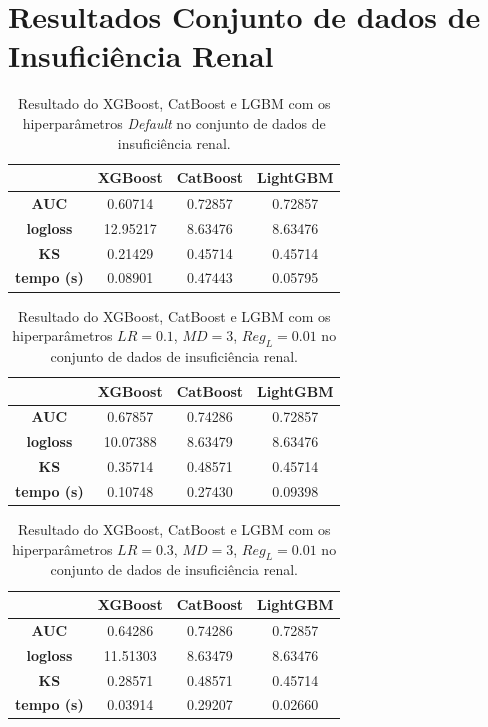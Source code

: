 \section{Resultados Conjunto de dados de Insuficiência Renal}
\begin{table}[H]
\centering
\begin{tabular}{|c|c|c|c|}
\hline
	& \textbf{XGBoost} &\textbf{CatBoost} & \textbf{LightGBM} \\
\hline
\textbf{AUC}	& 0.60714&	0.72857	&0.72857\\
\hline
\textbf{logloss}	& 12.95217	&8.63476	&8.63476\\
\hline
\textbf{KS}	&0.21429	&0.45714	&0.45714\\
\hline
\textbf{tempo (s)}	&0.08901	&0.47443	&0.05795 \\
\hline
\end{tabular}
\caption{Resultado do XGBoost, CatBoost e LGBM com os hiperparâmetros \textit{Default} no conjunto de dados de insuficiência renal.}\label{res:ren:1}
\end{table}

\begin{table}[H]
\label{res:ren:2}
\centering
\begin{tabular}{|c|c|c|c|}
\hline
	& \textbf{XGBoost} &\textbf{CatBoost} & \textbf{LightGBM} \\
\hline
\textbf{AUC}	& 0.67857	&0.74286	&0.72857\\
\hline
\textbf{logloss}	& 10.07388	&8.63479	&8.63476\\
\hline
\textbf{KS}	&0.35714&	0.48571&	0.45714\\
\hline
\textbf{tempo (s)}	&0.10748	&0.27430	&0.09398 \\
\hline
\end{tabular}
\caption{Resultado do XGBoost, CatBoost e LGBM com os hiperparâmetros $LR=0.1$, $MD=3$, $Reg_L=0.01$ no conjunto de dados de insuficiência renal.}
\end{table}

\begin{table}[H]
\label{res:ren:3}
\centering
\begin{tabular}{|c|c|c|c|}
\hline
	& \textbf{XGBoost} &\textbf{CatBoost} & \textbf{LightGBM} \\
\hline
\textbf{AUC}	& 0.64286	&0.74286	&0.72857\\
\hline
\textbf{logloss}	& 11.51303	&8.63479	&8.63476\\
\hline
\textbf{KS}	&0.28571	&0.48571	&0.45714\\
\hline
\textbf{tempo (s)}	&0.03914	&0.29207	&0.02660 \\
\hline
\end{tabular}
\caption{Resultado do XGBoost, CatBoost e LGBM com os hiperparâmetros $LR=0.3$, $MD=3$, $Reg_L=0.01$ no conjunto de dados de insuficiência renal.}
\end{table}

